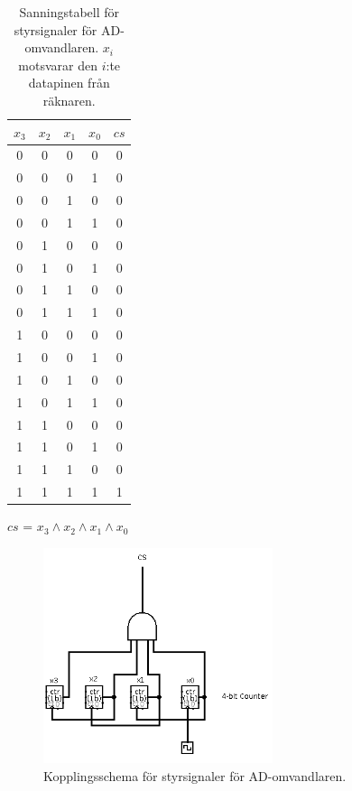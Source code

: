 \documentclass[a4paper,10pt]{article}
\begin{document}
\begin{table}[h]
\centering
\begin{tabular}{| c c c c || c |}
\hline
$x_3$ & $x_2$ & $x_1$ & $x_0$ & $cs$ \\\hline
0 & 0 & 0 & 0 & 0 \\
0 & 0 & 0 & 1 & 0 \\
0 & 0 & 1 & 0 & 0 \\
0 & 0 & 1 & 1 & 0 \\
0 & 1 & 0 & 0 & 0 \\
0 & 1 & 0 & 1 & 0 \\
0 & 1 & 1 & 0 & 0 \\
0 & 1 & 1 & 1 & 0 \\
1 & 0 & 0 & 0 & 0 \\
1 & 0 & 0 & 1 & 0 \\
1 & 0 & 1 & 0 & 0 \\
1 & 0 & 1 & 1 & 0 \\
1 & 1 & 0 & 0 & 0 \\
1 & 1 & 0 & 1 & 0 \\
1 & 1 & 1 & 0 & 0 \\
1 & 1 & 1 & 1 & 1 \\
\hline
\end{tabular}

$cs$ = $x_3 \wedge x_2 \wedge x_1 \wedge x_0$

\caption{Sanningstabell för styrsignaler för AD-omvandlaren. $x_i$ motsvarar den
$i$:te datapinen från räknaren.}
\label{tab:adc}
\end{table}

\begin{figure}[h]
\centering
\includegraphics[width=0.6\textwidth]{adccircuit.png}
\caption{Kopplingsschema för styrsignaler för AD-omvandlaren.}
\label{fig:adccircuit}
\end{figure}
\end{document}
